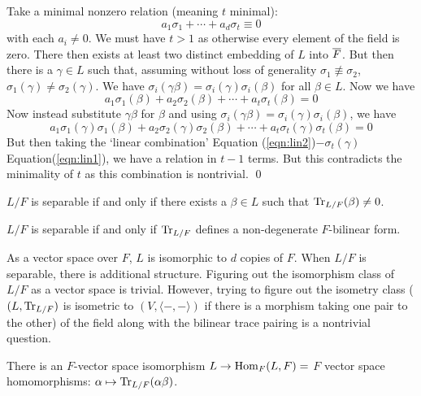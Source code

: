 \pf Take a minimal nonzero relation (meaning $t$ minimal):
	\[
	a_1 \sigma_1 + \cdots + a_d \sigma_t \equiv 0
	\]
with each $a_i \neq 0$. We must have $t>1$ as otherwise every element of the field is zero. There then exists at least two distinct embedding of $L$ into $\overline{F}$. But then there is a $\gamma \in L$ such that, assuming without loss of generality $\sigma_1 \not\equiv \sigma_2$, $\sigma_1(\gamma) \neq \sigma_2(\gamma)$. We have $\sigma_i(\gamma\beta)=\sigma_i(\gamma)\sigma_i(\beta)$ for all $\beta \in L$. Now we have
	\begin{equation}\label{eqn:lin1}
	a_1\sigma_1(\beta) + a_2\sigma_2(\beta) + \cdots + a_t \sigma_t(\beta)=0
	\end{equation}
Now instead substitute $\gamma \beta$ for $\beta$ and using $\sigma_i(\gamma\beta)=\sigma_i(\gamma)\sigma_i(\beta)$, we have
	\begin{equation}\label{eqn:lin2}
	a_1\sigma_1(\gamma)\sigma_1(\beta) + a_2\sigma_2(\gamma)\sigma_2(\beta) + \cdots + a_t \sigma_t(\gamma)\sigma_t(\beta)=0
	\end{equation}
But then taking the `linear combination' Equation (\ref{eqn:lin2})$- \sigma_t(\gamma)$ Equation(\ref{eqn:lin1}), we have a relation in $t-1$ terms. But this contradicts the minimality of $t$ as this combination is nontrivial. \qed \\

\begin{cor}
$L/F$ is separable if and only if there exists a $\beta \in L$ such that $\text{Tr}_{L/F}(\beta) \neq 0$.
\end{cor}

\begin{cor}
$L/F$ is separable if and only if $\text{Tr}_{L/F}$ defines a non-degenerate $F$-bilinear form. 
\end{cor}

As a vector space over $F$, $L$ is isomorphic to $d$ copies of $F$. When $L/F$ is separable, there is additional structure. Figuring out the isomorphism class of $L/F$ as a vector space is trivial. However, trying to figure out the isometry class ($(L,\text{Tr}_{L/F})$ is isometric to $(V,\langle -,-\rangle)$ if there is a morphism taking one pair to the other) of the field along with the bilinear trace pairing is a nontrivial question. 

\begin{cor}
There is an $F$-vector space isomorphism $L \to \operatorname{Hom}_F(L,F)=$ $F$ vector space homomorphisms: $\alpha \mapsto \text{Tr}_{L/F}(\alpha \beta)$.
\end{cor}

